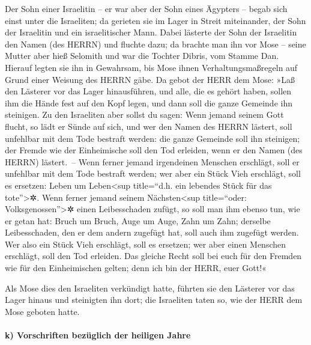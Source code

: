 Der Sohn einer Israelitin -- er war aber der Sohn eines
Ägypters -- begab sich einst unter die Israeliten; da gerieten sie im
Lager in Streit miteinander, der Sohn der Israelitin und ein
israelitischer Mann. Dabei lästerte der Sohn der
Israelitin den Namen (des HERRN) und fluchte dazu; da brachte man ihn
vor Mose -- seine Mutter aber hieß Selomith und war die Tochter Dibris,
vom Stamme Dan. Hierauf legten sie ihn in Gewahrsam, bis
Mose ihnen Verhaltungsmaßregeln auf Grund einer Weisung des HERRN gäbe.
Da gebot der HERR dem Mose: »Laß den
Lästerer vor das Lager hinausführen, und alle, die es gehört haben,
sollen ihm die Hände fest auf den Kopf legen, und dann soll die ganze
Gemeinde ihn steinigen. Zu den Israeliten aber sollst du
sagen: Wenn jemand seinem Gott flucht, so lädt er Sünde auf sich,
und wer den Namen des HERRN lästert, soll unfehlbar mit
dem Tode bestraft werden: die ganze Gemeinde soll ihn steinigen; der
Fremde wie der Einheimische soll den Tod erleiden, wenn er den Namen
(des HERRN) lästert.~-- Wenn ferner jemand irgendeinen
Menschen erschlägt, soll er unfehlbar mit dem Tode bestraft werden;
wer aber ein Stück Vieh erschlägt, soll es ersetzen:
Leben um Leben\textless sup title=``d.h. ein lebendes Stück für das
tote''\textgreater✲. Wenn ferner jemand seinem
Nächsten\textless sup title=``oder: Volksgenossen''\textgreater✲ einen
Leibesschaden zufügt, so soll man ihm ebenso tun, wie er getan hat:
Bruch um Bruch, Auge um Auge, Zahn um Zahn; derselbe
Leibesschaden, den er dem andern zugefügt hat, soll auch ihm zugefügt
werden. Wer also ein Stück Vieh erschlägt, soll es
ersetzen; wer aber einen Menschen erschlägt, soll den Tod erleiden.
Das gleiche Recht soll bei euch für den Fremden wie für
den Einheimischen gelten; denn ich bin der HERR, euer Gott!«

Als Mose dies den Israeliten verkündigt hatte, führten
sie den Lästerer vor das Lager hinaus und steinigten ihn dort; die
Israeliten taten so, wie der HERR dem Mose geboten hatte.

\hypertarget{k-vorschriften-bezuxfcglich-der-heiligen-jahre}{%
\paragraph{k) Vorschriften bezüglich der heiligen
Jahre}\label{k-vorschriften-bezuxfcglich-der-heiligen-jahre}}

